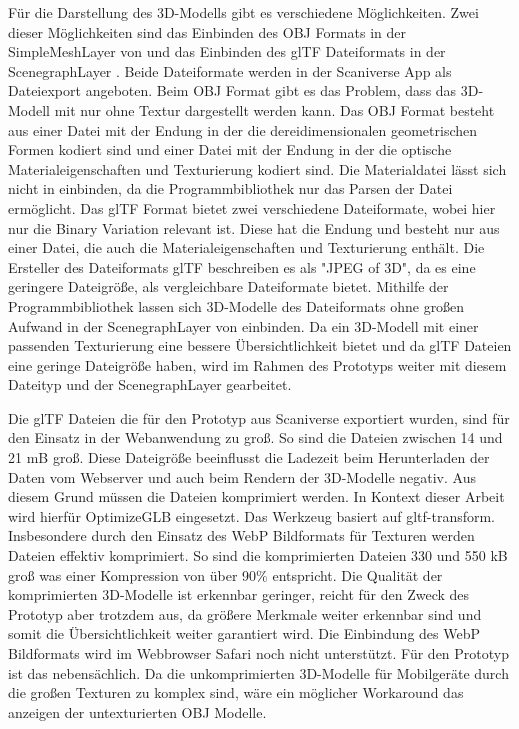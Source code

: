 Für die Darstellung des 3D-Modells gibt es verschiedene Möglichkeiten. Zwei dieser Möglichkeiten sind das Einbinden des \ac{OBJ} Formats in der SimpleMeshLayer 
von \deckgl{} und das Einbinden des \ac{glTF} Dateiformats in der ScenegraphLayer
. Beide Dateiformate werden in der Scaniverse App als Dateiexport angeboten. Beim \ac{OBJ} Format gibt es das Problem, dass das 3D-Modell mit \deckgl{} nur ohne Textur dargestellt werden kann. Das \ac{OBJ} Format besteht aus einer Datei mit der Endung \obj{} in der die dereidimensionalen geometrischen Formen kodiert sind und einer Datei mit der Endung \mtl{} in der die optische Materialeigenschaften und Texturierung kodiert sind. 
Die Materialdatei lässt sich nicht in \deckgl{} einbinden, da die \loadersgl{} Programmbibliothek nur das Parsen der \obj{} Datei ermöglicht. 
Das \ac{glTF} Format bietet zwei verschiedene Dateiformate, wobei hier nur die Binary Variation relevant ist. Diese hat die Endung \glb{} und besteht nur aus einer Datei, die auch die Materialeigenschaften und Texturierung enthält.
Die Ersteller des Dateiformats \ac{glTF} beschreiben es als "JPEG of 3D", da es eine geringere Dateigröße, als vergleichbare Dateiformate bietet.
Mithilfe der \loadersgl{} Programmbibliothek lassen sich 3D-Modelle des Dateiformats ohne großen Aufwand in der ScenegraphLayer von \deckgl{} einbinden. 
Da ein 3D-Modell mit einer passenden Texturierung eine bessere Übersichtlichkeit bietet und da \ac{glTF} Dateien eine geringe Dateigröße haben, wird im Rahmen des Prototyps weiter mit diesem Dateityp und der ScenegraphLayer gearbeitet.

Die \ac{glTF} Dateien die für den Prototyp aus Scaniverse exportiert wurden, sind für den Einsatz in der Webanwendung zu groß. So sind die Dateien zwischen 14 und 21 \ac{mB} groß. 
Diese Dateigröße beeinflusst die Ladezeit beim Herunterladen der Daten vom Webserver und auch beim Rendern der 3D-Modelle negativ. Aus diesem Grund müssen die Dateien komprimiert werden. In Kontext dieser Arbeit wird hierfür OptimizeGLB eingesetzt. Das Werkzeug basiert auf gltf-transform. Insbesondere durch den Einsatz des \ac{WebP} Bildformats für Texturen werden Dateien effektiv komprimiert. 
So sind die komprimierten Dateien 330 und 550 \ac{kB} groß was einer Kompression von über 90\% entspricht.
Die Qualität der komprimierten 3D-Modelle ist erkennbar geringer, reicht für den Zweck des Prototyp aber trotzdem aus, da größere Merkmale weiter erkennbar sind und somit die Übersichtlichkeit weiter garantiert wird. Die Einbindung des \ac{WebP} Bildformats wird im Webbrowser Safari noch nicht unterstützt. 
Für den Prototyp ist das nebensächlich. Da die unkomprimierten 3D-Modelle für Mobilgeräte durch die großen Texturen zu komplex sind, wäre ein möglicher Workaround das anzeigen der untexturierten \ac{OBJ} Modelle.

